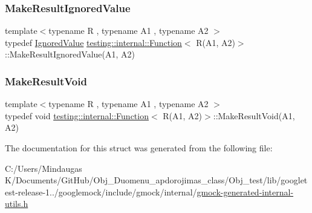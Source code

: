 \subsubsection{\texorpdfstring{MakeResultIgnoredValue}{MakeResultIgnoredValue}}
{\footnotesize\ttfamily template$<$typename R , typename A1 , typename A2 $>$ \\
typedef \mbox{\hyperlink{classtesting_1_1internal_1_1_ignored_value}{Ignored\+Value}} \mbox{\hyperlink{structtesting_1_1internal_1_1_function}{testing\+::internal\+::\+Function}}$<$ R(A1, A2)$>$\+::Make\+Result\+Ignored\+Value(A1, A2)}

\mbox{\label{structtesting_1_1internal_1_1_function_3_01_r_07_a1_00_01_a2_08_4_ada1ad22fa21c84ec3faea47ed20c1b46}} 
\subsubsection{\texorpdfstring{MakeResultVoid}{MakeResultVoid}}
{\footnotesize\ttfamily template$<$typename R , typename A1 , typename A2 $>$ \\
typedef void \mbox{\hyperlink{structtesting_1_1internal_1_1_function}{testing\+::internal\+::\+Function}}$<$ R(A1, A2)$>$\+::Make\+Result\+Void(A1, A2)}



The documentation for this struct was generated from the following file\+:\begin{DoxyCompactItemize}
\item 
C\+:/\+Users/\+Mindaugas K/\+Documents/\+Git\+Hub/\+Obj\+\_\+\+Duomenu\+\_\+apdorojimas\+\_\+class/\+Obj\+\_\+test/lib/googletest-\/release-\/1../googlemock/include/gmock/internal/\mbox{\hyperlink{gmock-generated-internal-utils_8h}{gmock-\/generated-\/internal-\/utils.\+h}}\end{DoxyCompactItemize}
